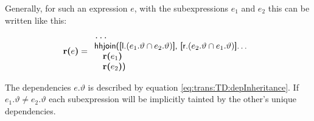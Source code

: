Generally, for such an expression $e$, with the subexpressions $e_1$ and $e_2$ this can be written
like this:
\begin{equation*}
\mbox{\textbf{r(}}e\mbox{\textbf{)}}=
\begin{array}{l}
\mbox{\texttt{\ldots}} \\
\mbox{\textsf{hhjoin([l.}}(e_1.\vartheta\cap e_2.\vartheta)\mbox{\textsf{], [r.}}(e_2.\vartheta\cap e_1.\vartheta)
\mbox{\textsf{]\ldots}} \\ \quad
\mbox{\textbf{r(}}e_1\mbox{\textbf{)}} \\ \quad
\mbox{\textbf{r(}}e_2\mbox{\textbf{)}\textsf{)}}
\end{array}
\end{equation*}

The dependencies $e.\vartheta$ is described by equation \ref{eq:trans:TD:depInheritance}. If $e_{1}.\vartheta \neq
e_{2}.\vartheta$ each subexpression will be implicitly tainted by the other's unique dependencies.


